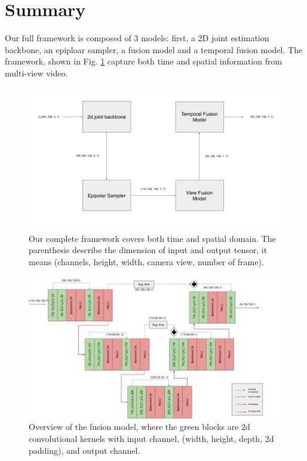 \section{Summary}
Our full framework is composed of 3 models: first, a 2D joint estimation backbone, an epiploar sampler, a fusion model and a temporal fusion model. The framework, shown in Fig. \ref{fig:full-framework} capture both time and spatial information from multi-view video.
\begin{figure}
	\centering
	\includegraphics[width=0.7\columnwidth]{figures/ch4/full-model.png}
	\caption{Our complete framework covers both time and spatial domain. The parenthesis describe the dimension of input and output tensor, it means (channels, height, width, camera view, number of frame).}
	\label{fig:full-framework}
\end{figure}
\begin{figure}
	\centering
	\includegraphics[width=1.0\columnwidth]{figures/ch4/temporal-fusion.png}
	\caption{Overview of the fusion model, where the green blocks are 2d convolutional kernels with input channel, (width, height, depth, 2d padding), and output channel.}
	\label{fig:view-baseline}
\end{figure}